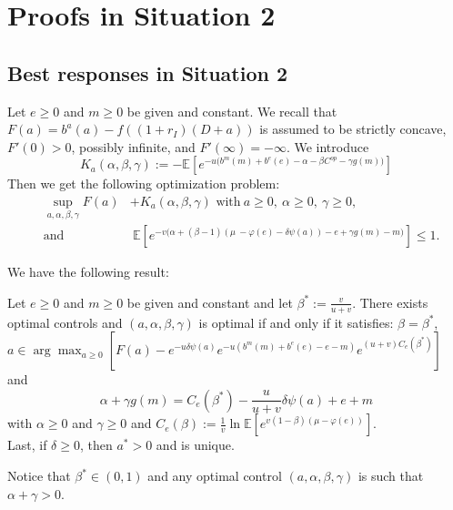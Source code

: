 \documentclass{svjour3}
\begin{document}
\section{Proofs in Situation 2}
\label{sec:proof2}

\subsection{Best responses in Situation 2}
\label{ssec:4.2}

Let $e\geq 0$ and $m\geq 0$ be given and constant. We recall that $F(a)=b^a(a)-f((1+r_I)(D+a))$
is assumed to be  strictly concave, $F'(0)>0$, possibly infinite, and $F'(\infty)=-\infty$. We introduce 
$$K_a(\alpha,\beta,\gamma):=-\mathbb{E}\left[e^{-u\big(b^m(m)+b^e(e)-\alpha-\beta C^{op}-\gamma g(m)\big)}\right]$$
 Then we get the following optimization problem:
\begin{eqnarray}
&\sup_{a,\alpha,\beta,\gamma}F(a)&+K_a(\alpha,\beta,\gamma)\mbox{ with}~a\geq 0,~\alpha\geq 0,~\gamma\geq 0,\\
&\mbox{and}&~\mathbb{E}\left[e^{-v\big(\alpha+(\beta-1)(\mu~-\varphi(e)-\delta\psi(a))-e+\gamma g(m)-m\big)}\right]\leq 1.\nonumber
\end{eqnarray}

We have the following result:
\begin{proposition}
\label{PropOptimumFirm1}
Let $e\geq 0$ and $m\geq 0$ be given and constant and let $\beta^*:=\frac{v}{u+v}$. 
There exists optimal controls and $(a,\alpha,\beta,\gamma)$ is optimal if and only if it satisfies: 
$\beta=\beta^*$, 
$a\in\arg\max_{a\geq 0} \left[ F(a)-e^{-u\delta\psi(a)}e^{-u(b^m(m)+b^e(e)-e-m)}e^{(u+v)C_e(\beta^*)}\right]$ 
and 
\begin{equation}
\alpha+\gamma g(m)=C_e(\beta^*)-\frac{u}{u+v}\delta\psi(a)+e+m
\label{infinitsol}
\end{equation}
 with $\alpha\geq 0$ and $\gamma\geq 0$ and  $C_e(\beta):=\frac{1}{v}\ln\mathbb{E}\left[e^{v(1-\beta)(\mu-\varphi( e))}\right]$.
\\
Last, if $\delta\geq 0$, then $a^*>0$ and is unique.

\end{proposition}

\begin{remark}
 Notice that $\beta^*\in(0,1)$ and any optimal control $(a,\alpha,\beta,\gamma)$ is such that $\alpha+\gamma>0$.
\end{remark} 
\end{document}
